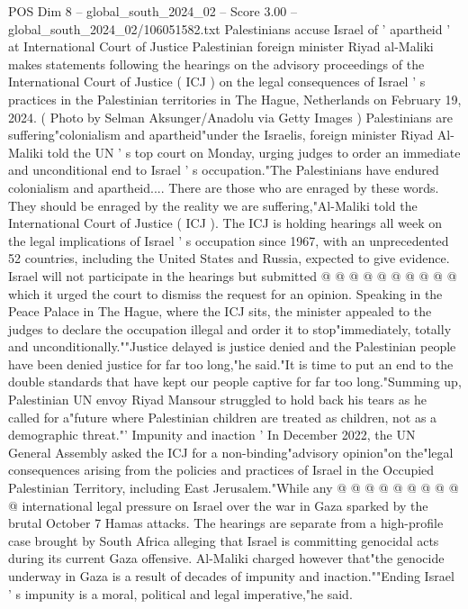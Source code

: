 \begin{textsample}{POS Dim 8 – global\_south\_2024\_02 – Score 3.00 – global\_south\_2024\_02/106051582.txt}  \label{ex:f8_pos_381}
Palestinians accuse Israel of ' apartheid ' at International Court of Justice Palestinian foreign minister Riyad al-Maliki makes statements following the hearings on the advisory proceedings of the International Court of Justice ( ICJ ) on the legal consequences of Israel ' s practices in the Palestinian territories in The Hague, Netherlands on February 19, 2024. ( Photo by Selman Aksunger/Anadolu via Getty Images ) Palestinians are suffering"colonialism and apartheid"under the Israelis, foreign minister Riyad Al-Maliki told the UN ' s top court on Monday, urging judges to order an immediate and unconditional end to Israel ' s occupation."The Palestinians have endured colonialism and apartheid....
There are those who are enraged by these words.
They should be enraged by the reality we are suffering,"Al-Maliki told the International Court of Justice ( ICJ ).
The ICJ is holding hearings all week on the legal implications of Israel ' s occupation since 1967, with an unprecedented 52 countries, including the United States and Russia, expected to give evidence.
Israel will not participate in the hearings but submitted @ @ @ @ @ @ @ @ @ @ which it urged the court to dismiss the request for an opinion.
Speaking in the Peace Palace in The Hague, where the ICJ sits, the minister appealed to the judges to declare the occupation illegal and order it to stop"immediately, totally and unconditionally.""Justice delayed is justice denied and the Palestinian people have been denied justice for far too long,"he said."It is time to put an end to the double standards that have kept our people captive for far too long."Summing up, Palestinian UN envoy Riyad Mansour struggled to hold back his tears as he called for a"future where Palestinian children are treated as children, not as a demographic threat."' Impunity and inaction ' In December 2022, the UN General Assembly asked the ICJ for a non-binding"advisory opinion"on the"legal consequences arising from the policies and practices of Israel in the Occupied Palestinian Territory, including East Jerusalem."While any @ @ @ @ @ @ @ @ @ @ international legal pressure on Israel over the war in Gaza sparked by the brutal October 7 Hamas attacks.
The hearings are separate from a high-profile case brought by South Africa alleging that Israel is committing genocidal acts during its current Gaza offensive.
Al-Maliki charged however that"the genocide underway in Gaza is a result of decades of impunity and inaction.""Ending Israel ' s impunity is a moral, political and legal imperative,"he said.

\end{textsample}
